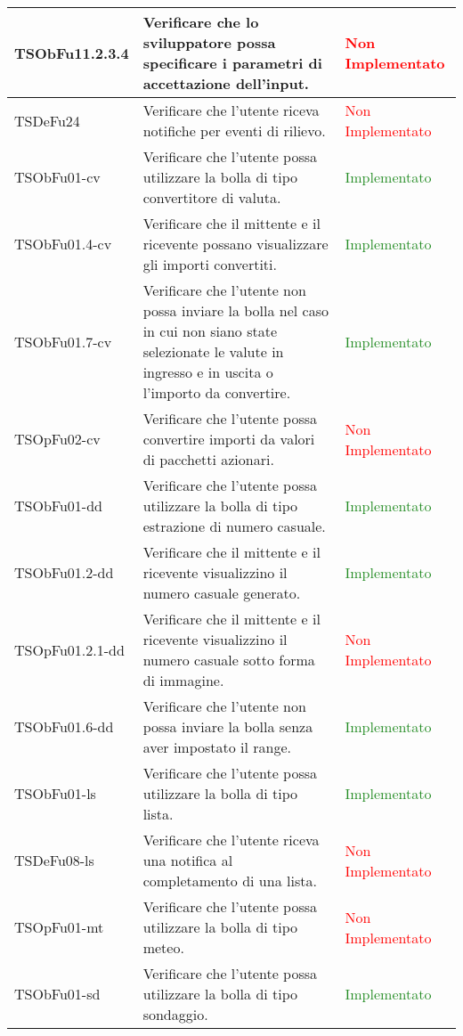 \begin{center}
\begin{longtable}{|
*{1}{>{\centering\arraybackslash}p{2.8cm}|}
*{1}{>{\centering\arraybackslash}p{6cm}|}
*{1}{>{\centering\arraybackslash}p{3cm}|}}
 \hline 
TSObFu11.2.3.4 & Verificare che lo sviluppatore possa specificare i parametri di accettazione dell'input. & \textcolor{Red}{Non Implementato}\\
 \hline 
TSDeFu24 & Verificare che l'utente riceva notifiche per eventi di rilievo. & \textcolor{Red}{Non Implementato}\\
 \hline 
TSObFu01-cv & Verificare che l'utente possa utilizzare la bolla di tipo convertitore di valuta. & \textcolor{ForestGreen}{Implementato}\\
 \hline 
TSObFu01.4-cv & Verificare che il mittente e il ricevente possano visualizzare gli importi convertiti. & \textcolor{ForestGreen}{Implementato}\\
 \hline 
TSObFu01.7-cv & Verificare che l'utente non possa inviare la bolla nel caso in cui non siano state selezionate le valute in ingresso e in uscita o l'importo da convertire. & \textcolor{ForestGreen}{Implementato}\\
 \hline 
TSOpFu02-cv & Verificare che l'utente possa convertire importi da valori di pacchetti azionari. & \textcolor{Red}{Non Implementato}\\
 \hline 
TSObFu01-dd & Verificare che l'utente possa utilizzare la bolla di tipo estrazione di numero casuale. & \textcolor{ForestGreen}{Implementato}\\
 \hline 
TSObFu01.2-dd & Verificare che il mittente e il ricevente visualizzino il numero casuale generato. & \textcolor{ForestGreen}{Implementato}\\
 \hline 
TSOpFu01.2.1-dd & Verificare che il mittente e il ricevente visualizzino il numero casuale sotto forma di immagine. & \textcolor{Red}{Non Implementato}\\
 \hline 
TSObFu01.6-dd & Verificare che l'utente non possa inviare la bolla senza aver impostato il range. & \textcolor{ForestGreen}{Implementato}\\
 \hline 
TSObFu01-ls & Verificare che l'utente possa utilizzare la bolla di tipo lista. & \textcolor{ForestGreen}{Implementato}\\
 \hline 
TSDeFu08-ls & Verificare che l'utente riceva una notifica al completamento di una lista. & \textcolor{Red}{Non Implementato}\\
 \hline 
TSOpFu01-mt & Verificare che l'utente possa utilizzare la bolla di tipo meteo. & \textcolor{Red}{Non Implementato}\\
 \hline 
TSObFu01-sd & Verificare che l'utente possa utilizzare la bolla di tipo sondaggio. & \textcolor{ForestGreen}{Implementato}\\

\end{longtable}
\end{center}
